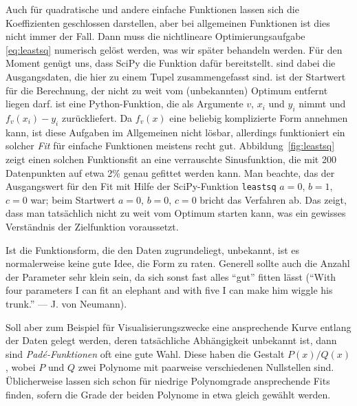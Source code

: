 Auch für quadratische und andere einfache Funktionen lassen sich die
Koeffizienten geschlossen darstellen, aber bei allgemeinen Funktionen
ist dies nicht immer der Fall. Dann muss die nichtlineare
Optimierungsaufgabe \eqref{eq:leastsq} numerisch gelöst werden, was
wir später behandeln werden. Für den Moment genügt uns, dass SciPy die
Funktion  dafür
bereitstellt.  sind dabei die Ausgangsdaten, die hier zu
einem Tupel zusammengefasst sind.  ist der Startwert für die
Berechnung, der nicht zu weit vom (unbekannten) Optimum entfernt
liegen darf.  ist eine Python-Funktion, die als Argumente
$v$, $x_i$ und $y_i$ nimmt und $f_v(x_i) - y_i$ zurückliefert.  Da
$f_v(x)$ eine beliebig komplizierte Form annehmen kann, ist diese
Aufgaben im Allgemeinen nicht lösbar, allerdings funktioniert ein
solcher \emph{Fit} für einfache Funktionen meistens recht
gut. Abbildung~\ref{fig:leastsq} zeigt einen solchen Funktionsfit an
eine verrauschte Sinusfunktion, die mit 200 Datenpunkten auf etwa 2\%
genau gefittet werden kann. Man beachte, das der Ausgangswert für den
Fit mit Hilfe der SciPy-Funktion \lstinline!leastsq! $a=0$, $b=1$,
$c=0$ war; beim Startwert $a=0$, $b=0$, $c=0$ bricht das Verfahren
ab. Das zeigt, dass man tatsächlich nicht zu weit vom Optimum starten
kann, was ein gewisses Verständnis der Zielfunktion voraussetzt.

Ist die Funktionsform, die den Daten zugrundeliegt, unbekannt, ist es
normalerweise keine gute Idee, die Form zu raten. Generell sollte auch
die Anzahl der Parameter sehr klein sein, da sich sonst fast alles
"`gut"' fitten lässt ("`With four parameters I can fit an elephant and
with five I can make him wiggle his trunk."' --- J. von Neumann).

Soll aber zum Beispiel für Visualisierungszwecke eine ansprechende
Kurve entlang der Daten gelegt werden, deren tatsächliche Abhängigkeit
unbekannt ist, dann sind \emph{Pad\'e-Funktionen} oft eine gute
Wahl. Diese haben die Gestalt $P(x)/Q(x)$, wobei $P$ und $Q$ zwei
Polynome mit paarweise verschiedenen Nullstellen sind. Üblicherweise
lassen sich schon für niedrige Polynomgrade ansprechende Fits finden,
sofern die Grade der beiden Polynome in etwa gleich gewählt werden.

